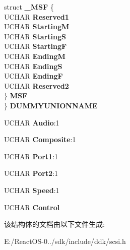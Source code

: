 \begin{DoxyCompactItemize}
\begin{tabbing}
\>struct {\bfseries \_MSF} \{\\
\>\>UCHAR {\bfseries Reserved1}\\
\>\>UCHAR {\bfseries StartingM}\\
\>\>UCHAR {\bfseries StartingS}\\
\>\>UCHAR {\bfseries StartingF}\\
\>\>UCHAR {\bfseries EndingM}\\
\>\>UCHAR {\bfseries EndingS}\\
\>\>UCHAR {\bfseries EndingF}\\
\>\>UCHAR {\bfseries Reserved2}\\
\>\} {\bfseries MSF}\\
\} {\bfseries DUMMYUNIONNAME}\\

\end{tabbing}\item 
\mbox{\label{struct___c_d_b_1_1___p_l_a_y___c_d_aafd7d289acb05321125c4f017772c292}} 
U\+C\+H\+AR {\bfseries Audio}\+:1
\item 
\mbox{\label{struct___c_d_b_1_1___p_l_a_y___c_d_ad46bc87019731f168d27319b50e694f8}} 
U\+C\+H\+AR {\bfseries Composite}\+:1
\item 
\mbox{\label{struct___c_d_b_1_1___p_l_a_y___c_d_a05e181687168390010f48f6b4baa5185}} 
U\+C\+H\+AR {\bfseries Port1}\+:1
\item 
\mbox{\label{struct___c_d_b_1_1___p_l_a_y___c_d_a91e50c1fbdfe94ff55f7ca17240f8734}} 
U\+C\+H\+AR {\bfseries Port2}\+:1
\item 
\mbox{\label{struct___c_d_b_1_1___p_l_a_y___c_d_a321162da3769c856cfe7d061ae1a8d1f}} 
U\+C\+H\+AR {\bfseries Speed}\+:1
\item 
\mbox{\label{struct___c_d_b_1_1___p_l_a_y___c_d_a3954dcc76e86043ec33092ea55548db8}} 
U\+C\+H\+AR {\bfseries Control}
\end{DoxyCompactItemize}


该结构体的文档由以下文件生成\+:\begin{DoxyCompactItemize}
\item 
E\+:/\+React\+O\+S-\/0../sdk/include/ddk/scsi.\+h\end{DoxyCompactItemize}
